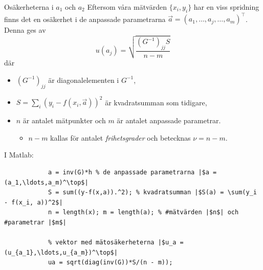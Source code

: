 \documentclass[9pt]{beamer}
\begin{document}
    \begin{frame}[fragile]{Osäkerheterna i $a_1$ och $a_2$}
        Eftersom våra mätvärden $\{x_i, y_i\}$ har en viss spridning finns det
        en osäkerhet i de anpassade parametrarna $\vec a = (a_1,\ldots,a_j,\ldots,a_m)^\top$. Denna ges av
        \begin{equation*}
            u(a_j) = \sqrt{\frac{(G^{-1})_{jj}S}{n - m}}
        \end{equation*}
        där
        \begin{itemize}
            \item $(G^{-1})_{jj}$ är diagonalelementen i $G^{-1}$,
            \item $S=\sum_i(y_i - f(x_i,\vec a))^2$ är kvadratsumman som tidigare,
            \item $n$ är antalet mätpunkter och $m$ är antalet anpassade parametrar.
                \begin{itemize}
                    \item $n-m$ kallas för antalet \emph{frihetsgrader} och betecknas $\nu = n - m$.
                \end{itemize}
        \end{itemize}

        \vfill
        I Matlab:
        \begin{verbatim}
            a = inv(G)*h % de anpassade parametrarna |$a = (a_1,\ldots,a_m)^\top$|
            S = sum((y-f(x,a)).^2); % kvadratsumman |$S(a) = \sum(y_i - f(x_i, a))^2$|
            n = length(x); m = length(a); % #mätvärden |$n$| och #parametrar |$m$|

            % vektor med mätosäkerheterna |$u_a = (u_{a_1},\ldots,u_{a_m})^\top$|
            ua = sqrt(diag(inv(G))*S/(n - m));
        \end{verbatim}
    \end{frame}
\end{document}
